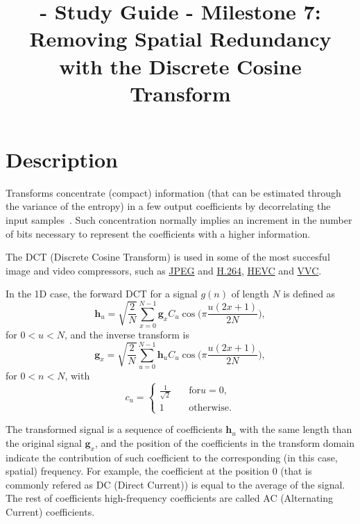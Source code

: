 
\title{\SM{} - Study Guide - Milestone 7: Removing Spatial Redundancy with the Discrete Cosine Transform}

\maketitle

\tableofcontents

\section{Description}

Transforms concentrate (compact) information (that can be estimated
through the variance of the entropy) in a few output coefficients by
decorrelating the input samples~\cite{sayood2017introduction}. Such
concentration normally implies an increment in the number of bits
necessary to represent the coefficients with a higher information.

The DCT (Discrete Cosine Transform) is used in some of the most
succesful image and video compressors, such as
\href{https://en.wikipedia.org/wiki/JPEG}{JPEG} and
\href{https://en.wikipedia.org/wiki/Advanced_Video_Coding}{H.264},
\href{https://en.wikipedia.org/wiki/Advanced_Video_Coding}{HEVC} and
\href{https://en.wikipedia.org/wiki/Versatile_Video_Coding}{VVC}.

In the 1D case, the forward DCT for a signal $g(n)$ of
length $N$ is defined as~\cite{burger2016digital}
\begin{equation}
  {\mathbf h}_u = \sqrt{\frac{2}{N}}\sum_{x=0}^{N-1}{\mathbf
    g}_xC_u\cos\Big(\pi\frac{u(2x+1)}{2N}\Big),
\end{equation}
for $0<u<N$, and the inverse transform is
\begin{equation}
  {\mathbf g}_x = \sqrt{\frac{2}{N}}\sum_{u=0}^{N-1}{\mathbf
    h}_uC_u\cos\Big(\pi\frac{u(2x+1)}{2N}\Big),
\end{equation}
for $0<n<N$, with
\begin{equation}
  c_u = \left\{
  \begin{array}{ll}
    \frac{1}{\sqrt{2}} & \quad \text{for} u=0, \\
    1 & \quad \text{otherwise}.
  \end{array}
  \right.
\end{equation}

The transformed signal is a sequence of coefficients ${\mathbf h}_u$
with the same length than the original signal ${\mathbf g}_x$, and the
position of the coefficients in the transform domain indicate the
contribution of such coefficient to the corresponding (in this case,
spatial) frequency. For example, the coefficient at the position 0
(that is commonly refered as DC (Direct Current)) is equal to the
average of the signal. The rest of coefficients high-frequency
coefficients are called AC (Alternating Current) coefficients.

